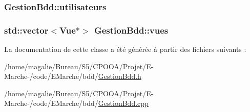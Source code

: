 \hypertarget{class_gestion_bdd_a43b0bcad5d1eb6ff51c78ceb6cdd972c}{
\subsubsection[{utilisateurs}]{ Gestion\-Bdd\-::utilisateurs\hspace{0.3cm}{\ttfamily [protected]}}}\label{class_gestion_bdd_a43b0bcad5d1eb6ff51c78ceb6cdd972c}
\hypertarget{class_gestion_bdd_a44ea1efd29c4996b1dcba0bf428051a7}{
\subsubsection[{vues}]{\setlength{\rightskip}{0pt plus 5cm}std\-::vector$<${\bf Vue}$\ast$$>$ Gestion\-Bdd\-::vues\hspace{0.3cm}{\ttfamily [protected]}}}\label{class_gestion_bdd_a44ea1efd29c4996b1dcba0bf428051a7}


La documentation de cette classe a été générée à partir des fichiers suivants \-:\begin{DoxyCompactItemize}
\item 
/home/magalie/\-Bureau/\-S5/\-C\-P\-O\-O\-A/\-Projet/\-E-\/\-Marche-\//code/\-E\-Marche/bdd/\hyperlink{_gestion_bdd_8h}{Gestion\-Bdd.\-h}\item 
/home/magalie/\-Bureau/\-S5/\-C\-P\-O\-O\-A/\-Projet/\-E-\/\-Marche-\//code/\-E\-Marche/bdd/\hyperlink{_gestion_bdd_8cpp}{Gestion\-Bdd.\-cpp}\end{DoxyCompactItemize}
